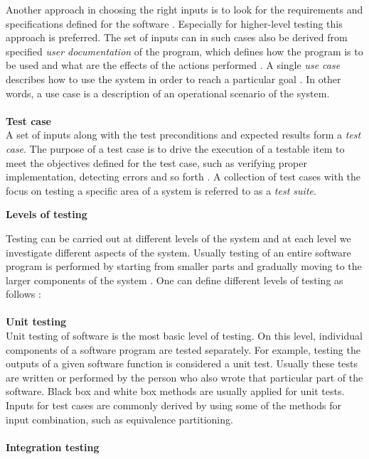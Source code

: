 \documentclass[english,12pt,a4paper,pdftex,elec,utf8]{aaltothesis}
\begin{document}
Another approach in choosing the right inputs is to look for the requirements and specifications defined for the software \cite{artofsofttesting}. Especially for higher-level testing this approach is preferred. The set of inputs can in such cases also be derived from specified \textit{user  documentation} of the program, which defines how the program is to be used and what are the effects of the actions performed \cite{artofsofttesting}. A single \textit{use case} describes how to use the system in order to reach a particular goal \cite{sularikurssi}. In other words, a use case is a description of an operational scenario of the system.\\
\\
\textbf{Test case}\\
A set of inputs along with the test preconditions and expected results form a \textit{test case}. The purpose of a test case is to drive the execution of a testable item to meet the objectives defined for the test case, such as verifying proper implementation, detecting errors and so forth \cite{ieeesofttesting1}.
A collection of test cases with the focus on testing a specific area of a system is referred to as a \textit{test suite}.   
\begin{center}
\textbf{Levels of testing}
\end{center}
Testing can be carried out at different levels of the system and at each level we investigate different aspects of the system. Usually testing of an entire software program is performed by starting from smaller parts and gradually moving to the larger components of the system \cite{sularikurssi, testingcomplex}.
One can define different levels of testing as follows \cite{sularikurssi, artofsofttesting, ieeesofttesting1}:\\ 
\\
\textbf{Unit testing}\\ 
Unit testing of software is the most basic level of testing. On this level, individual components of a software program are tested separately. For example, testing the outputs of a given software function is considered a unit test. Usually these tests are written or performed by the person who also wrote that particular part of the software. Black box and white box methods are usually applied for unit tests. Inputs for test cases are commonly derived by using some of the methods for input combination, such as equivalence partitioning.
\\
\\
\textbf{Integration testing}\\
\end{document}
